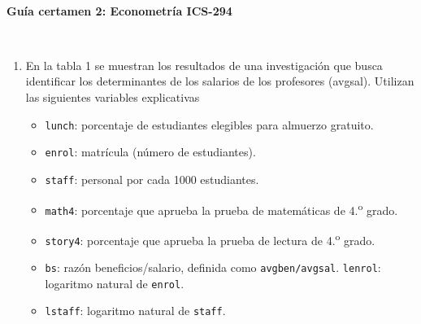 \documentclass[12pt]{article}
\begin{document}
\vspace{5cm}



\begin{center}
\begin{large}
\textbf{\\Guía certamen 2: Econometría ICS-294}
\end{large}\\
\end{center}

\begin{enumerate}
   
\item 
En la tabla 1  se muestran los resultados de una investigación que busca identificar los determinantes de los salarios de los profesores (avgsal).  Utilizan las siguientes variables explicativas 

\begin{itemize}
   \item \texttt{lunch}: porcentaje de estudiantes elegibles para almuerzo gratuito.
  \item \texttt{enrol}: matrícula (número de estudiantes).
  \item \texttt{staff}: personal por cada 1000 estudiantes.
 
  \item \texttt{math4}: porcentaje que aprueba la prueba de matemáticas de 4.\textsuperscript{o} grado.
  \item \texttt{story4}: porcentaje que aprueba la prueba de lectura de 4.\textsuperscript{o} grado.
  \item \texttt{bs}: razón beneficios/salario, definida como \texttt{avgben/avgsal}.
 \texttt{lenrol}: logaritmo natural de \texttt{enrol}.
  \item \texttt{lstaff}: logaritmo natural de \texttt{staff}.
\end{itemize}

\begin{table}[H] \centering 
  \caption{Salarios de los profesores}  \label{tabla_reg}%


\end{table}
\end{enumerate}
\end{document}
